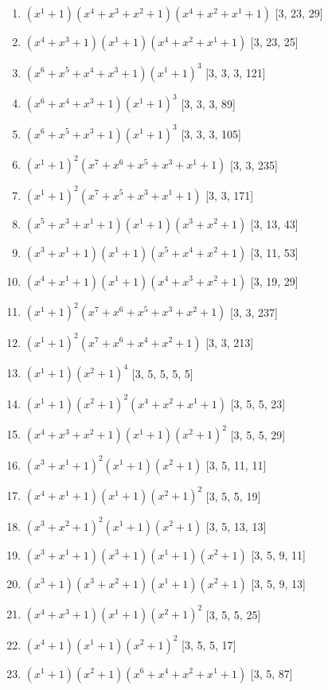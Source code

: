 \documentclass[10pt,twocolumn]{article}
\begin{document}
\begin{enumerate}
\item $(x^{1} + 1)(x^{4} + x^{3} + x^{2} + 1)(x^{4} + x^{2} + x^{1} + 1)$  [3, 23, 29]
\item $(x^{4} + x^{3} + 1)(x^{1} + 1)(x^{4} + x^{2} + x^{1} + 1)$  [3, 23, 25]
\item $(x^{6} + x^{5} + x^{4} + x^{3} + 1)(x^{1} + 1)^{3}$  [3, 3, 3, 121]
\item $(x^{6} + x^{4} + x^{3} + 1)(x^{1} + 1)^{3}$  [3, 3, 3, 89]
\item $(x^{6} + x^{5} + x^{3} + 1)(x^{1} + 1)^{3}$  [3, 3, 3, 105]
\item $(x^{1} + 1)^{2}(x^{7} + x^{6} + x^{5} + x^{3} + x^{1} + 1)$  [3, 3, 235]
\item $(x^{1} + 1)^{2}(x^{7} + x^{5} + x^{3} + x^{1} + 1)$  [3, 3, 171]
\item $(x^{5} + x^{3} + x^{1} + 1)(x^{1} + 1)(x^{3} + x^{2} + 1)$  [3, 13, 43]
\item $(x^{3} + x^{1} + 1)(x^{1} + 1)(x^{5} + x^{4} + x^{2} + 1)$  [3, 11, 53]
\item $(x^{4} + x^{1} + 1)(x^{1} + 1)(x^{4} + x^{3} + x^{2} + 1)$  [3, 19, 29]
\item $(x^{1} + 1)^{2}(x^{7} + x^{6} + x^{5} + x^{3} + x^{2} + 1)$  [3, 3, 237]
\item $(x^{1} + 1)^{2}(x^{7} + x^{6} + x^{4} + x^{2} + 1)$  [3, 3, 213]
\item $(x^{1} + 1)(x^{2} + 1)^{4}$  [3, 5, 5, 5, 5]
\item $(x^{1} + 1)(x^{2} + 1)^{2}(x^{4} + x^{2} + x^{1} + 1)$  [3, 5, 5, 23]
\item $(x^{4} + x^{3} + x^{2} + 1)(x^{1} + 1)(x^{2} + 1)^{2}$  [3, 5, 5, 29]
\item $(x^{3} + x^{1} + 1)^{2}(x^{1} + 1)(x^{2} + 1)$  [3, 5, 11, 11]
\item $(x^{4} + x^{1} + 1)(x^{1} + 1)(x^{2} + 1)^{2}$  [3, 5, 5, 19]
\item $(x^{3} + x^{2} + 1)^{2}(x^{1} + 1)(x^{2} + 1)$  [3, 5, 13, 13]
\item $(x^{3} + x^{1} + 1)(x^{3} + 1)(x^{1} + 1)(x^{2} + 1)$  [3, 5, 9, 11]
\item $(x^{3} + 1)(x^{3} + x^{2} + 1)(x^{1} + 1)(x^{2} + 1)$  [3, 5, 9, 13]
\item $(x^{4} + x^{3} + 1)(x^{1} + 1)(x^{2} + 1)^{2}$  [3, 5, 5, 25]
\item $(x^{4} + 1)(x^{1} + 1)(x^{2} + 1)^{2}$  [3, 5, 5, 17]
\item $(x^{1} + 1)(x^{2} + 1)(x^{6} + x^{4} + x^{2} + x^{1} + 1)$  [3, 5, 87]

\end{enumerate}
\end{document}
